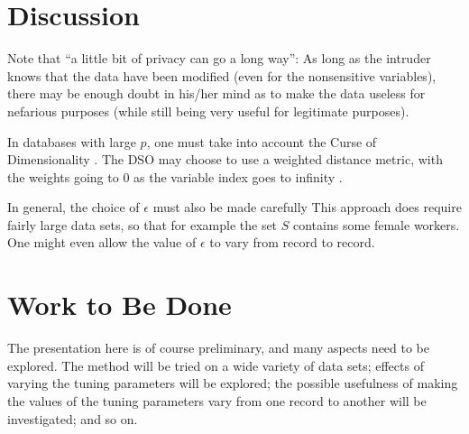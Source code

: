 \documentclass[11pt]{article}
\begin{document}

\section{Discussion}

Note that ``a little bit of privacy can go a long way'':  As long as the
intruder knows that the data have been modified (even for the
nonsensitive variables), there may be enough doubt in his/her mind as to
make the data useless for nefarious purposes (while still being very
useful for legitimate purposes).

In databases with large $p$, one must take into account the Curse of
Dimensionality \cite{beyer}.  The DSO may choose to use a weighted
distance metric, with the weights going to 0 as the variable index goes
to infinity \cite{matloff2015}.

In general, the choice of $\epsilon$ must also be made carefully
This approach does require fairly large data sets, so that for example
the set $S$ contains some female workers.  One might even allow the
value of $\epsilon$ to vary from record to record.

\section{Work to Be Done}

The presentation here is of course preliminary, and many aspects need to
be explored.  The method will be tried on a wide variety of data sets;
effects of varying the tuning parameters will be explored; the possible
usefulness of making the values of the tuning parameters vary from one
record to another will be investigated; and so on.
\end{document}
